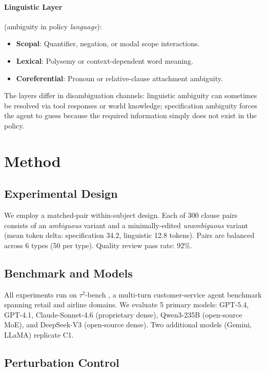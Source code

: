 \documentclass[11pt]{article}
\begin{document}
\paragraph{Linguistic Layer} (ambiguity in policy \emph{language}):
\begin{itemize}
\item \textbf{Scopal}: Quantifier, negation, or modal scope interactions.
\item \textbf{Lexical}: Polysemy or context-dependent word meaning.
\item \textbf{Coreferential}: Pronoun or relative-clause attachment ambiguity.
\end{itemize}

The layers differ in disambiguation channels: linguistic ambiguity can sometimes be resolved via tool responses or world knowledge; specification ambiguity forces the agent to guess because the required information simply does not exist in the policy.

\section{Method}

\subsection{Experimental Design}

We employ a matched-pair within-subject design. Each of 300 clause pairs consists of an \emph{ambiguous} variant and a minimally-edited \emph{unambiguous} variant (mean token delta: specification 34.2, linguistic 12.8 tokens). Pairs are balanced across 6 types (50 per type). Quality review pass rate: 92\%.

\subsection{Benchmark and Models}

All experiments run on $\tau^2$-bench \cite{tau2bench2024}, a multi-turn customer-service agent benchmark spanning retail and airline domains. We evaluate 5 primary models: GPT-5.4, GPT-4.1, Claude-Sonnet-4.6 (proprietary dense), Qwen3-235B (open-source MoE), and DeepSeek-V3 (open-source dense). Two additional models (Gemini, LLaMA) replicate C1.

\subsection{Perturbation Control}
\end{document}
